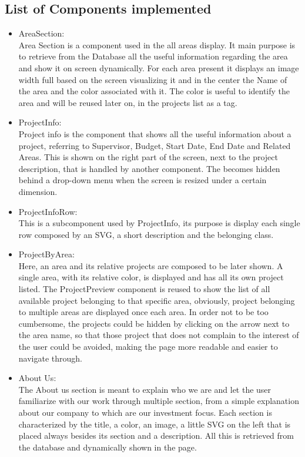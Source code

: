 \documentclass[11pt, letterpaper]{article}
\begin{document}
\subsection{List of Components implemented}
\begin{itemize}
    \item AreaSection: \\
        Area Section is a component used in the all areas display. It main purpose is to retrieve from the Database all the useful information regarding the area and show it on screen dynamically.
        For each area present it displays an image width full based on the screen visualizing it and in the center the Name of the area and the color associated with it. The color is useful to identify the area and will be reused later on, in the projects list as a tag.
    \item ProjectInfo: \\
        Project info is the component that shows all the useful information about a project, referring to Supervisor, Budget, Start Date, End Date and Related Areas. This is shown on the right part of the screen, next to the project description, that is handled by another component. The  becomes hidden behind a drop-down menu when the screen is resized under a certain dimension.
    \item ProjectInfoRow: \\
        This is a subcomponent used by ProjectInfo, its purpose is display each single row composed by an SVG, a short description and the belonging class.
    \item ProjectByArea: \\
        Here, an area and its relative projects are composed to be later shown. A single area, with its relative color, is displayed and has all its own project listed.
        The ProjectPreview component is reused to show the list of all available project belonging to that specific area, obviously, project belonging to multiple areas are displayed once each area.
        In order not to be too cumbersome, the projects could be hidden by clicking on the arrow next to the area name, so that those project that does not complain to the interest of the user could be avoided, making the page more readable and easier to navigate through.
    \item About Us: \\
        The About us section is meant to explain who we are and let the user familiarize with our work through multiple section, from a simple explanation about our company to which are our investment focus. Each section is characterized by the title, a color, an image, a little SVG on the left that is placed always besides its section and a description. All this is retrieved from the database and dynamically shown in the page.

\end{itemize}
\end{document}
